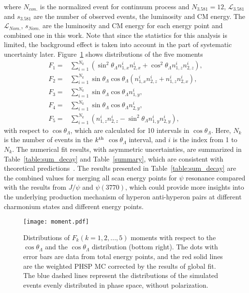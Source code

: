 \documentclass[a4paper,11pt]{article}
\begin{document}
where $N_{con.}$ is the normalized event for continuum process and $N_{3.581} = 12$, $\mathcal{L}_{3.581}$ and $s_{3.581}$ are the number of observed events, the luminosity and CM energy.
The $\mathcal{L}_{Nom.}$, $s_{Nom.}$ are the luminosity and CM energy for each energy point and combined one in this work.
Note that since the statistics for this analysis is limited, the background effect is taken into account in the part of systematic uncertainty later.  
Figure~\ref{scatter_plot::llb:projections} shows distributions of the five moments \cite{Faldt:2017kgy}
\begin{align}
 \label{eq:tangles}
{{F}}_1 = &\sum_{i=1}^{N_k}(\sin^2\!\theta_{\Lambda} n^i_{1, x}n^i_{2, x} + \cos^2\!\theta_{\Lambda} n^i_{1, z}n^i_{2, z}),\nonumber\\
{{F}}_2 = &\sum_{i=1}^{N_k}\sin\!\theta_{\Lambda}\cos\!\theta_{\Lambda} (n^i_{1, x}n^i_{2, z} + n^i_{1, z}n^i_{2, x}),\nonumber\\
{{F}}_3 = &\sum_{i=1}^{N_k}\sin\!\theta_{\Lambda}\cos\!\theta_{\Lambda} n^i_{1, y},\\
{{F}}_4 = &\sum_{i=1}^{N_k}\sin\!\theta_{\Lambda}\cos\!\theta_{\Lambda} n^i_{2, y},\nonumber\\
{{F}}_5 = &\sum_{i=1}^{N_k}(n^i_{1, z}n^i_{2, z} - \sin^2\!\theta_{\Lambda} n^i_{1, y}n^i_{2, y}),\nonumber
\end{align}
with respect to $\cos\theta_{\Lambda}$, which are calculated for 10 intervals in $\cos\theta_{\Lambda}$. Here, $N_k$ is the number of events in the $k^{\rm th}$ $\cos\theta_{\Lambda}$ interval, and $i$ is the index from 1 to $N_k$.
The numerical fit results, with asymmetric uncertainties, are summarized in Table~\ref{table:sum_decay} and Table~\ref{summary}, which are consistent with theoretical predictions~\cite{PRD_116016}. 
The results presented in Table~\ref{table:sum_decay} are the combined values for  merging all scan energy points for $\psi$ resonance compared with the results from $J/\psi$ and $\psi(3770)$, which could provide more insights into the underlying production mechanism of hyperon anti-hyperon pairs at different charmonium states and different energy points.
 \begin{figure}[!htbp]
 \begin{center}
     \texttt{[image: moment.pdf]}
 \end{center}
\caption{
Distributions of ${F}_{k} (k = 1, 2, ..., 5)$ moments with respect to the $\cos\theta_{\Lambda}$ and the $\cos\theta_{\Lambda}$  distribution (bottom right). The dots with error bars are data from total energy points, and the red solid lines are the weighted PHSP MC corrected by the results of global fit.
The blue dashed lines represent the distributions of the simulated events evenly distributed in phase space, without polarization.}
\label{scatter_plot::llb:projections}
\end{figure}
\end{document}
